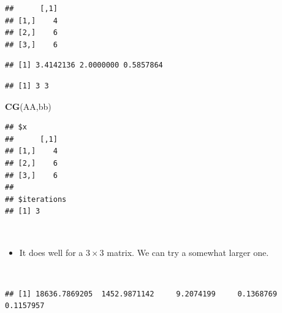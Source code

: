 \documentclass[]{article}
\newenvironment{Shaded}{\begin{snugshade}}{\end{snugshade}}
\newcommand{\KeywordTok}[1]{\textcolor[rgb]{0.13,0.29,0.53}{\textbf{#1}}}
\newcommand{\DecValTok}[1]{\textcolor[rgb]{0.00,0.00,0.81}{#1}}
\newcommand{\OperatorTok}[1]{\textcolor[rgb]{0.81,0.36,0.00}{\textbf{#1}}}
\newcommand{\NormalTok}[1]{#1}
\begin{document}
\begin{verbatim}
##      [,1]
## [1,]    4
## [2,]    6
## [3,]    6
\end{verbatim}

\begin{Shaded}
\end{Shaded}

\begin{verbatim}
## [1] 3.4142136 2.0000000 0.5857864
\end{verbatim}

\begin{verbatim}
## [1] 3 3
\end{verbatim}

\begin{Shaded}
\begin{Highlighting}[]
\KeywordTok{CG}\NormalTok{(AA,bb)}
\end{Highlighting}
\end{Shaded}

\begin{verbatim}
## $x
##      [,1]
## [1,]    4
## [2,]    6
## [3,]    6
## 
## $iterations
## [1] 3
\end{verbatim}

~

\begin{itemize} \item[] 
It does well for a $3 \times 3$ matrix. We can try a somewhat larger one.
  \end{itemize}

~

\begin{Shaded}
\end{Shaded}

\begin{verbatim}
## [1] 18636.7869205  1452.9871142     9.2074199     0.1368769     0.1157957
\end{verbatim}
\end{document}

